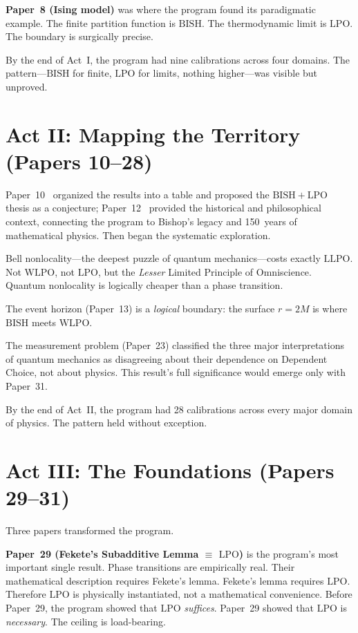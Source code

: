 \documentclass[11pt,a4paper]{report}
\theoremstyle{plain}
\theoremstyle{definition}
\theoremstyle{remark}
\newcommand{\BISH}{\mathrm{BISH}}
\newcommand{\LLPO}{\mathrm{LLPO}}
\newcommand{\WLPO}{\mathrm{WLPO}}
\newcommand{\LPO}{\mathrm{LPO}}
\begin{document}
\textbf{Paper~8 (Ising model)} was where the program found its paradigmatic example. The finite partition function is $\BISH$. The thermodynamic limit is $\LPO$. The boundary is surgically precise.

By the end of Act~I, the program had nine calibrations across four domains. The pattern---$\BISH$ for finite, $\LPO$ for limits, nothing higher---was visible but unproved.

\section*{Act II: Mapping the Territory (Papers 10--28)}

Paper~10~\cite{Lee2026P10} organized the results into a table and proposed the $\BISH+\LPO$ thesis as a conjecture; Paper~12~\cite{Lee2026P12} provided the historical and philosophical context, connecting the program to Bishop's legacy and 150~years of mathematical physics. Then began the systematic exploration.

Bell nonlocality---the deepest puzzle of quantum mechanics---costs exactly $\LLPO$. Not $\WLPO$, not $\LPO$, but the \emph{Lesser} Limited Principle of Omniscience. Quantum nonlocality is logically cheaper than a phase transition.

The event horizon (Paper~13) is a \emph{logical} boundary: the surface $r=2M$ is where $\BISH$ meets $\WLPO$.

The measurement problem (Paper~23) classified the three major interpretations of quantum mechanics as disagreeing about their dependence on Dependent Choice, not about physics. This result's full significance would emerge only with Paper~31.

By the end of Act~II, the program had 28 calibrations across every major domain of physics. The pattern held without exception.

\section*{Act III: The Foundations (Papers 29--31)}

Three papers transformed the program.

\textbf{Paper~29 (Fekete's Subadditive Lemma $\equiv$ $\LPO$)} is the program's most important single result. Phase transitions are empirically real. Their mathematical description requires Fekete's lemma. Fekete's lemma requires $\LPO$. Therefore $\LPO$ is physically instantiated, not a mathematical convenience. Before Paper~29, the program showed that $\LPO$ \emph{suffices}. Paper~29 showed that $\LPO$ is \emph{necessary}. The ceiling is load-bearing.
\end{document}
